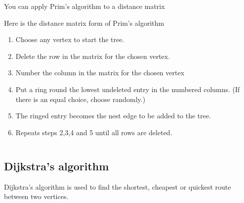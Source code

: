 \documentclass[a4paper]{article}
\begin{document}
\begin{eg}

\end{eg}

You can apply Prim's algorithm to a distance matrix
\begin{defi}
Here is the distance matrix form of Prim's algorithm
\begin{enumerate}
\item Choose any vertex to start the tree.
\item Delete the row in the matrix for the chosen vertex.
\item Number the column in the matrix for the chosen vertex
\item Put a ring round the lowest undeleted entry in the numbered columns. (If there is an equal choice, choose randomly.)
\item The ringed entry becomes the nest edge to be added to the tree.
\item Repeats steps 2,3,4 and 5 until all rows are deleted.
\end{enumerate}
\end{defi}

\begin{eg}
\begin{tabular}{c|ccccc}

\end{tabular}
\end{eg}

\subsection{Dijkstra's algorithm}
Dijkstra's algorithm is used to find the shortest, cheapest or quickest route between two vertices.
\end{document}
